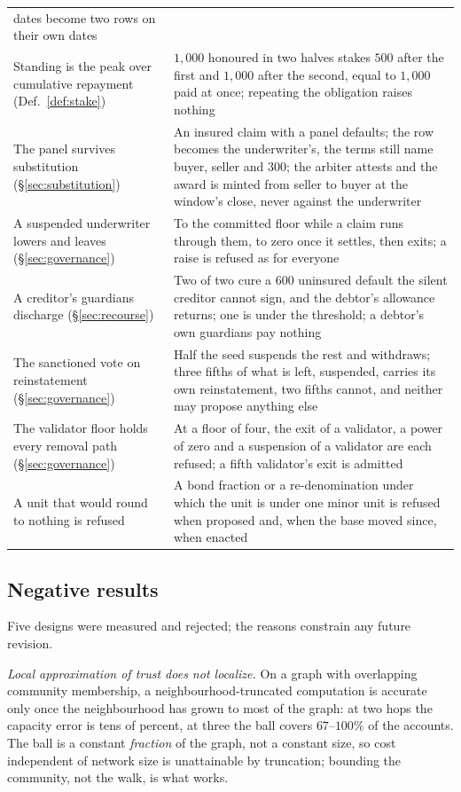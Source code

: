 \begin{longtable}{@{}p{}p{}@{}}
    dates become two rows on their own dates \\
Standing is the peak over cumulative repayment (Def.~\ref{def:stake})
  & $1{,}000$ honoured in two halves stakes $500$ after the first and $1{,}000$ after the
    second, equal to $1{,}000$ paid at once; repeating the obligation raises nothing \\
The panel survives substitution (\S\ref{sec:substitution})
  & An insured claim with a panel defaults; the row becomes the underwriter's, the terms
    still name buyer, seller and $300$; the arbiter attests and the award is minted from
    seller to buyer at the window's close, never against the underwriter \\
A suspended underwriter lowers and leaves (\S\ref{sec:governance})
  & To the committed floor while a claim runs through them, to zero once it settles, then
    exits; a raise is refused as for everyone \\
A creditor's guardians discharge (\S\ref{sec:recourse})
  & Two of two cure a $600$ uninsured default the silent creditor cannot sign, and the
    debtor's allowance returns; one is under the threshold; a debtor's own guardians pay
    nothing \\
The sanctioned vote on reinstatement (\S\ref{sec:governance})
  & Half the seed suspends the rest and withdraws; three fifths of what is left, suspended,
    carries its own reinstatement, two fifths cannot, and neither may propose anything else \\
The validator floor holds every removal path (\S\ref{sec:governance})
  & At a floor of four, the exit of a validator, a power of zero and a suspension of a
    validator are each refused; a fifth validator's exit is admitted \\
A unit that would round to nothing is refused
  & A bond fraction or a re-denomination under which the unit is under one minor unit is
    refused when proposed and, when the base moved since, when enacted \\
\end{longtable}

\subsection{Negative results}

Five designs were measured and rejected; the reasons constrain any future revision.

\emph{Local approximation of trust does not localize.} On a graph with overlapping
community membership, a neighbourhood-truncated computation is accurate only once the
neighbourhood has grown to most of the graph: at two hops the capacity error is tens of
percent, at three the ball covers $67$--$100\%$ of the accounts. The ball is a constant
\emph{fraction} of the graph, not a constant size, so cost independent of network size is
unattainable by truncation; bounding the community, not the walk, is what works.

